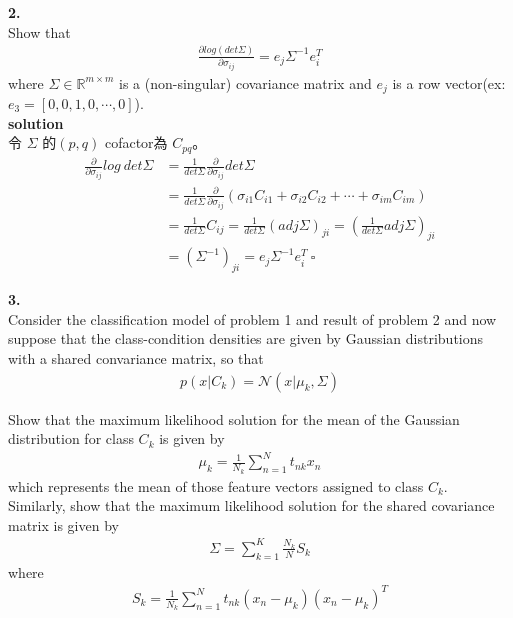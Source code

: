 \documentclass{article}
\begin{document}
\noindent
{\bf 2.}\\

Show that
\begin{align*}
    \frac{\partial log(det \Sigma)}{\partial \sigma_{ij}} = e_j \Sigma^{−1} e^T_i
\end{align*}
where $\Sigma \in {\mathbb R}^{m \times m}$ is a (non-singular) covariance matrix and $e_j$ is a row vector(ex: $e_3 = [0, 0, 1, 0, \cdots, 0]$).\\

\noindent
{\bf \large solution}\\

\noindent
令 $\Sigma$ 的$(p, q)$ cofactor為 $C_{pq}$。\\
\begin{align*}
    \frac{\partial}{\partial \sigma_{ij}} log\ det \Sigma &= \frac{1}{det \Sigma} \frac{\partial}{\partial \sigma_{ij}} det \Sigma\\
    &= \frac{1}{det \Sigma} \frac{\partial}{\partial \sigma_{ij}} (\sigma_{i1} C_{i1} + \sigma_{i2} C_{i2} + \cdots + \sigma_{im} C_{im})\\
    &= \frac{1}{det \Sigma} C_{ij} = \frac{1}{det \Sigma} (adj \Sigma)_{ji} =  (\frac{1}{det \Sigma} adj \Sigma)_{ji}\\
    &= (\Sigma^{-1})_{ji} = e_j \Sigma^{-1} e_i^T\ \square
\end{align*}

\noindent
{\bf 3.}\\

Consider the classification model of problem 1 and result of problem 2 and now suppose that the class-condition densities are given by Gaussian distributions with a shared convariance matrix, so that
\begin{align*}
    p(x|C_k) = {\mathcal N}(x|\mu_k, \Sigma)
\end{align*}

Show that the maximum likelihood solution for the mean of the Gaussian distribution for class $C_k$ is given by
\begin{align*}
    \mu_k = \frac{1}{N_k} \sum_{n = 1}^{N} t_{nk}x_n
\end{align*}
which represents the mean of those feature vectors assigned to class $C_k$.\\

Similarly, show that the maximum likelihood solution for the shared covariance matrix is given by
\begin{align*}
    \Sigma = \sum_{k = 1}^{K} \frac{N_k}{N} S_k
\end{align*}
where
\begin{align*}
    S_k = \frac{1}{N_k} \sum_{n = 1}^{N} t_{nk}(x_n − \mu_k)(x_n − \mu_k)^T
\end{align*}
\end{document}
